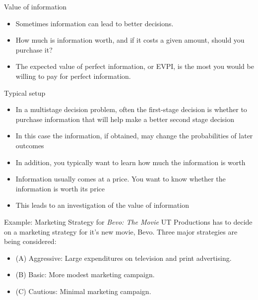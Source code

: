 \documentclass{beamer}\usepackage[]{graphicx}\usepackage[]{color}
\begin{document}
\begin{darkframes}
    \begin{frame}[fragile]{Value of information}

        \begin{itemize}[<+->]
            \item Sometimes information can lead to better decisions.
            \item How much is information worth, and if it costs a given amount, should you purchase it?
            \item The expected value of perfect information, or EVPI, is the most you would be willing to pay for perfect information.
        \end{itemize}

     \end{frame}


    \begin{frame}[fragile]{Typical setup}

      \begin{itemize}[<+->]
        \item In a multistage decision problem, often the first-stage decision is whether to purchase information that will help make a better second stage decision
        \item In this case the information, if obtained, may change the probabilities of later outcomes
        \item In addition, you typically want to learn how much the information is worth
        \item Information usually comes at a price.  You want to know whether the information is worth its price
        \item This leads to an investigation of the value of information
        \end{itemize} 

    \end{frame}



    \begin{frame}[fragile]{Example: Marketing Strategy for \emph{Bevo: The Movie}}
      \fontsize{10}{10}\selectfont
      UT Productions has to decide on a marketing strategy for it's new movie, Bevo.  Three major strategies are being considered:
      \begin{itemize} [<+->]
        \item (A) Aggressive: Large expenditures on television and print advertising.
        \item (B) Basic: More modest marketing campaign.
        \item (C) Cautious: Minimal marketing campaign.
      \end{itemize} 
      

\end{frame}
\end{darkframes}
\end{document}
